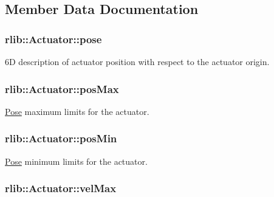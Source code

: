 \subsection{Member Data Documentation}
\hypertarget{classrlib_1_1Actuator_adcce3f106abc4127382d0d9794bb7b15}{
\subsubsection[{pose}]{ rlib\-::\-Actuator\-::pose\hspace{0.3cm}{\ttfamily [protected]}}}\label{classrlib_1_1Actuator_adcce3f106abc4127382d0d9794bb7b15}
6\-D description of actuator position with respect to the actuator origin. \hypertarget{classrlib_1_1Actuator_ae0dd994c7e78e9db5580ea23d1361f4e}{
\subsubsection[{pos\-Max}]{ rlib\-::\-Actuator\-::pos\-Max\hspace{0.3cm}{\ttfamily [protected]}}}\label{classrlib_1_1Actuator_ae0dd994c7e78e9db5580ea23d1361f4e}
\hyperlink{classrlib_1_1Pose}{Pose} maximum limits for the actuator. \hypertarget{classrlib_1_1Actuator_a4ab8363fb4cfe849f1bb89720387d222}{
\subsubsection[{pos\-Min}]{ rlib\-::\-Actuator\-::pos\-Min\hspace{0.3cm}{\ttfamily [protected]}}}\label{classrlib_1_1Actuator_a4ab8363fb4cfe849f1bb89720387d222}
\hyperlink{classrlib_1_1Pose}{Pose} minimum limits for the actuator. \hypertarget{classrlib_1_1Actuator_a54b50a2b0f4cb61a4e5c70fa72a126dc}{
\subsubsection[{vel\-Max}]{ rlib\-::\-Actuator\-::vel\-Max\hspace{0.3cm}{\ttfamily [protected]}}}\label{classrlib_1_1Actuator_a54b50a2b0f4cb61a4e5c70fa72a126dc}
